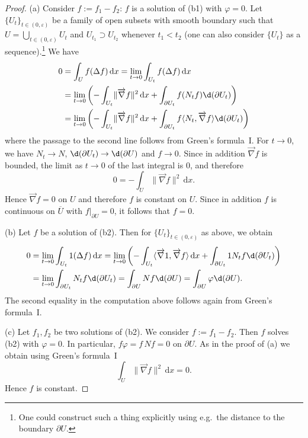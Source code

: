 \documentclass[12pt, oneside, a4paper]{article}
\def\grad{\operatorname{grad}}
\theoremstyle{dfn}
\def \grad {\overrightarrow{\nabla}}
\newcommand{\scalprod}[2]{\langle #1,#2 \rangle}
\def\dx{\,\mathrm dx}
\providecommand{\norm}[1]{\lVert#1\rVert}
\begin{document}
\begin{proof}
(a) Consider $f:= f_1 - f_2$: $f$ is a solution of (b1) with $\varphi = 0$. Let $\{U_t\}_{t \in (0,\varepsilon)}$ be a family of open subsets with smooth boundary such that $U = \bigcup_{t \in (0,\varepsilon)} U_t$ and $U_{t_1} \supset U_{t_2}$ whenever $t_1 < t_2$ (one can also consider $\{U_t\}$ as a sequence).\footnote{One could construct such a thing explicitly using e.g.\ the distance to the boundary $\partial U$.} We have
\begin{align*}
	0
	&= \int_U f(\Delta f) \dx
	= \lim_{t \to 0} \int_{U_t} f(\Delta f) \dx \\
	&= \lim_{t \to 0} \left( -\int_{U_t} \norm{\grad f}^2 \dx + \int_{\partial U_t} f(N_t f) \d(\partial U_t) \right) \\
	&= \lim_{t \to 0} \left( -\int_{U_t} \norm{\grad f}^2 \dx + \int_{\partial U_t} f \scalprod{N_t}{\grad f} \d(\partial U_t) \right)
\end{align*}
where the passage to the second line follows from Green's formula~I. For $t \to 0$, we have $N_t \to N$, $\d(\partial U_t) \to \d(\partial U)$ and $f \to 0$. Since in addition $\grad f$ is bounded, the limit as $t \to 0$ of the last integral is $0$, and therefore
\[
0 = -\int_U \norm{\grad f}^2 \dx.
\]
Hence $\grad f = 0$ on $U$ and therefore $f$ is constant on $U$. Since in addition $f$ is continuous on $\overline{U}$ with $f|_{\partial U} = 0$, it follows that $f = 0$.

(b) Let $f$ be a solution of (b2). Then for $\{U_t\}_{t\in (0,\varepsilon)}$ as above, we obtain
\begin{align*}
	0 &= \lim_{t \to 0} \int_{U_t} 1 (\Delta f) \dx
	= \lim_{t \to 0} \left( -\int_{U_t} \scalprod{\grad 1}{\grad f} \dx + \int_{\partial U_t} 1N_t f \d(\partial U_t) \right) \\
	&= \lim_{t \to 0} \int_{\partial U_t} N_t f \d(\partial U_t)
	= \int_{\partial U} N f \d(\partial U) 
	= \int_{\partial U} \varphi \d(\partial U).
\end{align*}
The second equality in the computation above follows again from Green's formula~I.

(c) Let $f_1, f_2$ be two solutions of (b2). We consider $f:= f_1 - f_2$. Then $f$ solves (b2) with $\varphi = 0$. In particular, $f \varphi = f \, Nf = 0$ on $\partial U$. As in the proof of (a) we obtain using Green's formula~I
\[
\int_U \norm{\grad f}^2 \dx = 0.
\]
Hence $f$ is constant.
\end{proof}
\end{document}

